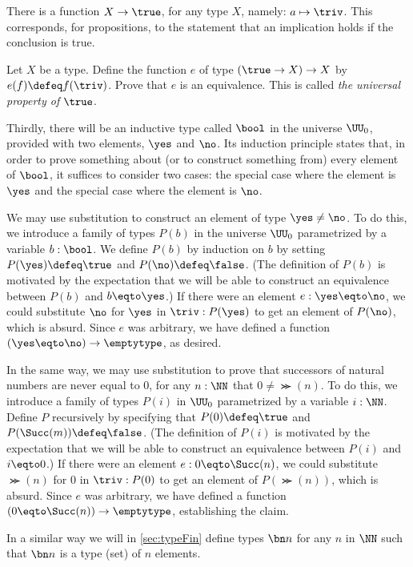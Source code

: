 There is a function $X \to \true$, for any type $X$, namely: $a \mapsto \triv$.  This corresponds, for propositions, to the statement that an
implication holds if the conclusion is true.

\begin{xca}\label{xca:True-univ-prop}
  Let $X$ be a type. Define the function $e$ of type
  $(\true\to X) \to X$ by $e(f)\defeq f(\triv)$. 
  Prove that $e$ is an equivalence.
  This is called \emph{the universal property of} $\true$.
\end{xca}

Thirdly, there will be an inductive type called $\bool$ in the universe $\UU_0$, provided with two elements, $\yes$ and $\no$.  Its induction
principle states that, in order to prove something about (or to construct something from) every element of $\bool$, it suffices to consider two
cases: the special case where the element is $\yes$ and the special case where the element is $\no$.

We may use substitution to construct an element of type $\yes \ne \no$.  To do this, we introduce a family of types $P(b)$ in the universe
$\UU_0$ parametrized by a variable $b:\bool$.  We define $P(b)$ by induction on $b$ by setting $P(\yes) \defeq \true$ and 
$P(\no) \defeq \false$.  (The definition of $P(b)$ is motivated by the expectation that we will be able to construct an equivalence between $P(b)$ and 
$b \eqto  \yes$.)  If there were an element $e: \yes \eqto \no$, we could substitute $\no$ for $\yes$ in $\triv : P (\yes)$ to get an element of $P(\no)$,
which is absurd.  Since $e$ was arbitrary, we have defined a function $(\yes \eqto \no) \to \emptytype$, as desired.

In the same way, we may use substitution to prove that successors of natural numbers are never equal to $0$, \ie for any $n:\NN$ that $0 \ne
\Succ(n)$.  To do this, we introduce a family of types $P(i)$ in $\UU_0$ parametrized by a variable $i:\NN$.  Define $P$ recursively by
specifying that $P(0) \defeq \true$ and $P(\Succ(m)) \defeq \false$.  (The definition of $P(i)$ is motivated by the expectation that we will be
able to construct an equivalence between $P(i)$ and $i \eqto 0$.)  If there were an element $e: 0 \eqto \Succ(n)$, we could substitute $\Succ(n)$ for $0$
in $\triv : P ( 0 )$ to get an element of $P(\Succ(n))$, which is absurd.  Since $e$ was arbitrary, we have defined a function $(0 \eqto \Succ(n)) \to \emptytype$,
establishing the claim.

In a similar way we will in \cref{sec:typeFin} define types $\bn n$ for any $n$ in $\NN$
such that $\bn n$ is a type (set) of $n$ elements.


